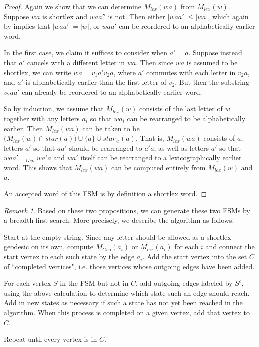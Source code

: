 \documentclass[10pt,a4paper]{amsart}
\theoremstyle{definition}
\theoremstyle{remark}
\newtheorem{remark}[theorem]{Remark}
\begin{document}
	\begin{proof}
		
		Again we show that we can determine $M_{lex}(wa)$ from $M_{lex}(w)$. Suppose $wa$ is shortlex and $waa''$ is not. Then either $|waa'|\le |wa|$, which again by \cite{Davis} implies that $|waa'|=|w|$, or $waa'$ can be reordered to an alphabetically earlier word.
		
		In the first case, we claim it suffices to consider when $a'=a$. Suppose instead that $a'$ cancels with a different letter in $wa$. Then since $wa$ is assumed to be shortlex, we can write $wa=v_1a'v_2a$, where $a'$ commutes with each letter in $v_2a$, and $a'$ is alphabetically earlier than the first letter of $v_2$. But then the substring $v_2aa'$ can already be reordered to an alphabetically earlier word.
		
		So by induction, we assume that $M_{lex}(w)$ consists of the last letter of $w$ together with any letters $a_i$ so that $wa_i$ can be rearranged to be alphabetically earlier. Then $M_{lex}(wa)$ can be taken to be $\bigl(M_{lex}(w)\cap star(a)\bigr)\cup \{a\}\cup star_<(a)$. That is, $M_{lex}(wa)$ consists of $a$, letters $a'$ so that $aa'$ should be rearranged to $a'a$, as well as letters $a'$ so that $waa'=_{Geo}wa'a$ and $wa'$ itself can be rearranged to a lexicographically earlier word. This shows that $M_{lex}(wa)$ can be computed entirely from $M_{lex}(w)$ and $a$.
		
		An accepted word of this FSM is by definition a shortlex word.
	\end{proof}
	
	\begin{remark}
		
		Based on these two propositions, we can generate these two FSMs by a breadth-first search. More precisely, we describe the algorithm as follows:
		
		Start at the empty string. Since any letter should be allowed as a shortlex geodesic on its own, compute $M_{Geo}(a_i)$ or $M_{lex}(a_i)$ for each $i$ and connect the start vertex to each such state by the edge $a_i$. Add the start vertex into the set $C$ of ``completed vertices", i.e. those vertices whose outgoing edges have been added.
		
		For each vertex $S$ in the FSM but not in $C$, add outgoing edges labeled by $S^c$, using the above calculation to determine which state such an edge should reach. Add in new states as necessary if such a state has not yet been reached in the algorithm. When this process is completed on a given vertex, add that vertex to $C$.
		
		Repeat until every vertex is in $C$.
		
	\end{remark}
	
\end{document}
